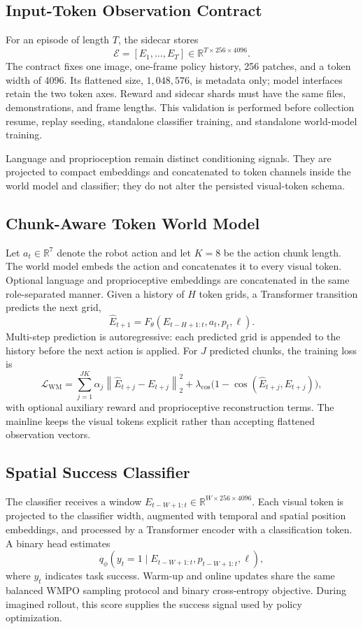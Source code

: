 \subsection{Input-Token Observation Contract}

For an episode of length $T$, the sidecar stores
\[
\mathcal{E}=[E_1,\ldots,E_T]
    \in \mathbb{R}^{T\times256\times4096}.
\]
The contract fixes one image, one-frame policy history, 256 patches, and a token
width of 4096.  Its flattened size, $1{,}048{,}576$, is metadata only; model
interfaces retain the two token axes.  Reward and sidecar shards must have the
same files, demonstrations, and frame lengths.  This validation is performed
before collection resume, replay seeding, standalone classifier training, and
standalone world-model training.

Language and proprioception remain distinct conditioning signals.  They are
projected to compact embeddings and concatenated to token channels inside the
world model and classifier; they do not alter the persisted visual-token
schema.

\subsection{Chunk-Aware Token World Model}

Let $a_t\in\mathbb{R}^{7}$ denote the robot action and let $K=8$ be the action
chunk length.  The world model embeds the action and concatenates it to every
visual token.  Optional language and proprioceptive embeddings are concatenated
in the same role-separated manner.  Given a history of $H$ token grids, a
Transformer transition predicts the next grid,
\[
\widehat{E}_{t+1}
  = F_\theta(E_{t-H+1:t},a_t,p_t,\ell).
\]
Multi-step prediction is autoregressive: each predicted grid is appended to
the history before the next action is applied.  For $J$ predicted chunks, the
training loss is
\[
\mathcal{L}_{\mathrm{WM}}
 = \sum_{j=1}^{JK} \alpha_j
   \left\|\widehat{E}_{t+j}-E_{t+j}\right\|_2^2
   + \lambda_{\cos}
   \bigl(1-\cos(\widehat{E}_{t+j},E_{t+j})\bigr),
\]
with optional auxiliary reward and proprioceptive reconstruction terms.  The
mainline keeps the visual tokens explicit rather than accepting flattened
observation vectors.

\subsection{Spatial Success Classifier}

The classifier receives a window
$E_{t-W+1:t}\in\mathbb{R}^{W\times256\times4096}$.
Each visual token is projected to the classifier width, augmented with temporal
and spatial position embeddings, and processed by a Transformer encoder with a
classification token.  A binary head estimates
\[
q_\phi(y_t=1\mid E_{t-W+1:t},p_{t-W+1:t},\ell),
\]
where $y_t$ indicates task success.  Warm-up and online updates share the same
balanced WMPO sampling protocol and binary cross-entropy objective.  During
imagined rollout, this score supplies the success signal used by policy
optimization.

